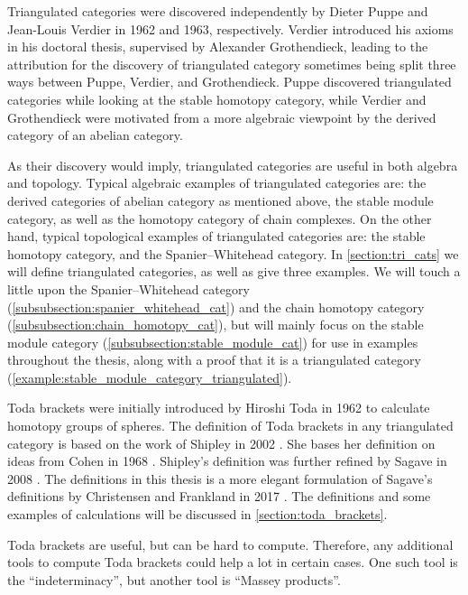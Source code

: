 Triangulated categories were discovered independently by Dieter Puppe and Jean-Louis Verdier in 1962 and 1963, respectively. Verdier introduced his axioms in his doctoral thesis, supervised by Alexander Grothendieck, leading to the attribution for the discovery of triangulated category sometimes being split three ways between Puppe, Verdier, and Grothendieck. Puppe discovered triangulated categories while looking at the stable homotopy category, while Verdier and Grothendieck were motivated from a more algebraic viewpoint by the derived category of an abelian category.

As their discovery would imply, triangulated categories are useful in both algebra and topology. Typical algebraic examples of triangulated categories are: the derived categories of abelian category as mentioned above, the stable module category, as well as the homotopy category of chain complexes. On the other hand, typical topological examples of triangulated categories are: the stable homotopy category, and the Spanier--Whitehead category. In \autoref{section:tri_cats} we will define triangulated categories, as well as give three examples. We will touch a little upon the Spanier--Whitehead category (\autoref{subsubsection:spanier_whitehead_cat}) and the chain homotopy category (\autoref{subsubsection:chain_homotopy_cat}), but will mainly focus on the stable module category (\autoref{subsubsection:stable_module_cat}) for use in examples throughout the thesis, along with a proof that it is a triangulated category (\autoref{example:stable_module_category_triangulated}).

Toda brackets were initially introduced by Hiroshi Toda in 1962 to calculate homotopy groups of spheres. The definition of Toda brackets in any triangulated category is based on the work of Shipley in 2002 \cite[Definition A.2]{Shipley_2002}. She bases her definition on ideas from Cohen in 1968 \cite[p. 308]{Cohen_1968}. Shipley's definition was further refined by Sagave in 2008 \cite[Remark 4.5]{Sagave_2008}. The definitions in this thesis is a more elegant formulation of Sagave's definitions by Christensen and Frankland in 2017 \cite[Definition 3.1]{Christensen-Frankland_2017}. The definitions and some examples of calculations will be discussed in \autoref{section:toda_brackets}.

Toda brackets are useful, but can be hard to compute. Therefore, any additional tools to compute Toda brackets could help a lot in certain cases. One such tool is the ``indeterminacy'', but another tool is ``Massey products''.

